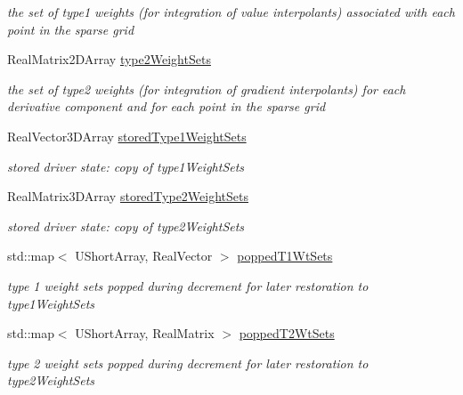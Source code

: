 \begin{DoxyCompactItemize}
\begin{DoxyCompactList}\small\item\em the set of type1 weights (for integration of value interpolants) associated with each point in the sparse grid \end{DoxyCompactList}\item 
Real\+Matrix2\+D\+Array \hyperlink{classPecos_1_1HierarchSparseGridDriver_abdaca2cdf2efec3b6b5af2d9adc04a54}{type2\+Weight\+Sets}\label{classPecos_1_1HierarchSparseGridDriver_abdaca2cdf2efec3b6b5af2d9adc04a54}

\begin{DoxyCompactList}\small\item\em the set of type2 weights (for integration of gradient interpolants) for each derivative component and for each point in the sparse grid \end{DoxyCompactList}\item 
Real\+Vector3\+D\+Array \hyperlink{classPecos_1_1HierarchSparseGridDriver_ac4aeabf6ae4069caa0608b5f1c0be43d}{stored\+Type1\+Weight\+Sets}\label{classPecos_1_1HierarchSparseGridDriver_ac4aeabf6ae4069caa0608b5f1c0be43d}

\begin{DoxyCompactList}\small\item\em stored driver state\+: copy of type1\+Weight\+Sets \end{DoxyCompactList}\item 
Real\+Matrix3\+D\+Array \hyperlink{classPecos_1_1HierarchSparseGridDriver_a8e2675de76cb8b6db1efe3375ba408a1}{stored\+Type2\+Weight\+Sets}\label{classPecos_1_1HierarchSparseGridDriver_a8e2675de76cb8b6db1efe3375ba408a1}

\begin{DoxyCompactList}\small\item\em stored driver state\+: copy of type2\+Weight\+Sets \end{DoxyCompactList}\item 
std\+::map$<$ U\+Short\+Array, Real\+Vector $>$ \hyperlink{classPecos_1_1HierarchSparseGridDriver_adacb7309f3bcc04193e19e0f673d491f}{popped\+T1\+Wt\+Sets}\label{classPecos_1_1HierarchSparseGridDriver_adacb7309f3bcc04193e19e0f673d491f}

\begin{DoxyCompactList}\small\item\em type 1 weight sets popped during decrement for later restoration to type1\+Weight\+Sets \end{DoxyCompactList}\item 
std\+::map$<$ U\+Short\+Array, Real\+Matrix $>$ \hyperlink{classPecos_1_1HierarchSparseGridDriver_a76484c1349edf58640be2caa82d99a66}{popped\+T2\+Wt\+Sets}\label{classPecos_1_1HierarchSparseGridDriver_a76484c1349edf58640be2caa82d99a66}

\begin{DoxyCompactList}\small\item\em type 2 weight sets popped during decrement for later restoration to type2\+Weight\+Sets \end{DoxyCompactList}\end{DoxyCompactItemize}
